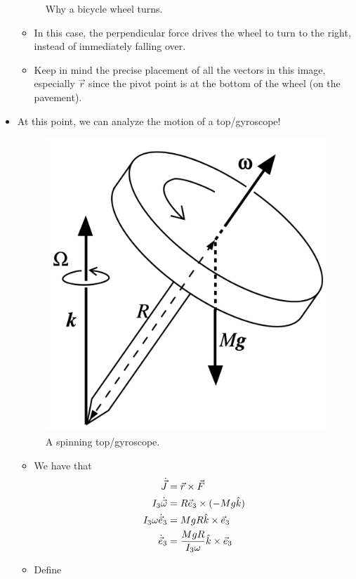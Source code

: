 \documentclass[../notes.tex]{subfiles}
\begin{document}
\begin{itemize}
\begin{figure}[h!]
        \caption{Why a bicycle wheel turns.}
        \label{fig:bicycleWheel}
    \end{figure}
    \begin{itemize}
        \item In this case, the perpendicular force drives the wheel to turn to the right, instead of immediately falling over.
        \item Keep in mind the precise placement of all the vectors in this image, especially $\vec{r}$ since the pivot point is at the bottom of the wheel (on the pavement).
    \end{itemize}
    \item At this point, we can analyze the motion of a top/gyroscope!
    \begin{figure}[H]
        \centering
        \includegraphics[width=0.25\linewidth]{../ExtFiles/topGyroscope.png}
        \caption{A spinning top/gyroscope.}
        \label{fig:topGyroscope}
    \end{figure}
    \begin{itemize}
        \item We have that
        \begin{align*}
            \dot{\vec{J}} &= \vec{r}\times\vec{F}\\
            I_3\dot{\vec{\omega}} &= R\vec{e}_3\times(-Mg\hat{k})\\
            I_3\omega\dot{\vec{e}}_3 &= MgR\hat{k}\times\vec{e}_3\\
            \dot{\vec{e}}_3 &= \frac{MgR}{I_3\omega}\hat{k}\times\vec{e}_3
        \end{align*}
        \item Define
        \begin{equation*}

\end{equation*}
\end{itemize}
\end{itemize}
\end{document}
